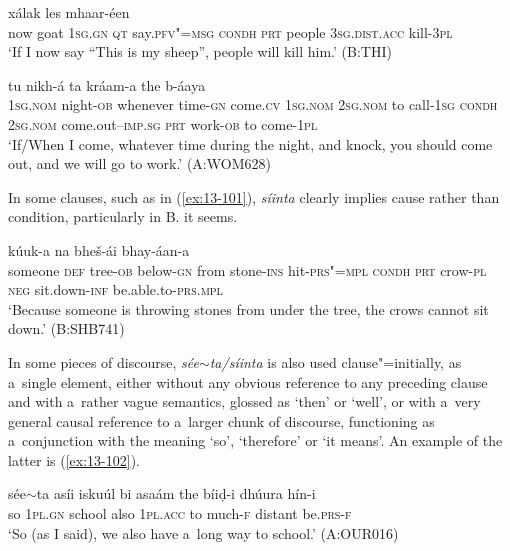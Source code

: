 \begin{exe}
\ex
\label{ex:13-99}
  xálak les mhaar-éen \\
now goat \textsc{1sg.gn} \textsc{qt} say.\textsc{pfv"=msg} \textsc{condh} \textsc{prt} people \textsc{3sg.dist.acc} kill-\textsc{3pl} \\
\glt `If I now say ``This is my sheep'', people will kill him.' (B:THI)

\ex
\label{ex:13-100}
 tu
nikh-á  ta kráam-a the b-áaya \\
\textsc{1sg.nom} night-\textsc{ob} whenever time-\textsc{gn} come.\textsc{cv} \textsc{1sg.nom}  \textsc{2sg.nom} to call-\textsc{1sg} \textsc{condh} \textsc{2sg.nom} come.out--\textsc{imp.sg}  \textsc{prt} work-\textsc{ob} to come-\textsc{1pl} \\
\glt `If/When I come, whatever time during the night, and knock, you should come out, and we will go to work.' (A:WOM628) 
\end{exe}

In some clauses, such as in (\ref{ex:13-101}), \textit{síinta} clearly implies cause rather than condition, particularly in B. it seems.

\begin{exe}
\ex
\label{ex:13-101}
 kúuk-a
na bheš-ái  bhay-áan-a \\
someone \textsc{def} tree-\textsc{ob} below-\textsc{gn} from stone-\textsc{ins}  hit-\textsc{prs"=mpl} \textsc{condh} \textsc{prt} crow-\textsc{pl} \textsc{neg} sit.down-\textsc{inf} be.able.to-\textsc{prs.mpl} \\
\glt `Because someone is throwing stones from under the tree, the crows cannot sit down.' (B:SHB741) 
\end{exe}

In some pieces of discourse, \textit{sée$\sim$ta/síinta} is also used clause"=initially, as a~single element, either without any obvious reference to any preceding clause and with a~rather vague semantics, glossed as `then' or `well', or with a~very general causal reference to a~larger chunk of discourse, functioning as a~conjunction with the meaning `so', `therefore' or `it means'. An example of the latter is (\ref{ex:13-102}).

\begin{exe}
\ex
\label{ex:13-102}
\gll sée$\sim$ta asíi iskuúl bi asaám the bíiḍ-i dhúura  hín-i \\
so \textsc{1pl.gn} school also \textsc{1pl.acc} to much-\textsc{f} distant be.\textsc{prs-f} \\
\glt `So (as I said), we also have a~long way to school.' (A:OUR016) 
\end{exe}

